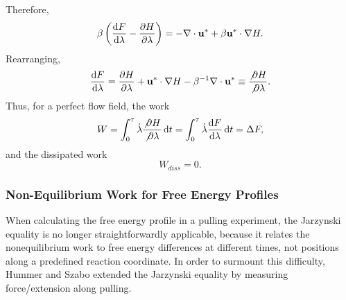 Therefore,
\begin{equation}
	\beta \left( \frac{\mathop{}\!\mathrm{d} F}{\mathop{}\!\mathrm{d} \lambda} - \frac{\partial H}{\partial \lambda} \right) = -\nabla \cdot \mathbf{u}^* + \beta \mathbf{u}^* \cdot \nabla H.
\end{equation}
Rearranging,
\begin{equation}
	\frac{\mathop{}\!\mathrm{d} F}{\mathop{}\!\mathrm{d} \lambda} = \frac{\partial H}{\partial \lambda} + \mathbf{u}^* \cdot \nabla H - \beta^{-1} \nabla \cdot \mathbf{u}^*\equiv \frac{\not{\partial} H}{\not{\partial} \lambda}.
\end{equation}
Thus, for a perfect flow field, the work
\begin{equation}
	W=\int_0^\tau \dot{\lambda} \frac{\not \partial H}{\not \partial \lambda} \mathop{}\!\mathrm{d} t=\int_0^\tau \dot{\lambda} \frac{\mathop{}\!\mathrm{d} F}{\mathop{}\!\mathrm{d} \lambda} \mathop{}\!\mathrm{d} t=\Delta F,
\end{equation}
and the dissipated work
\begin{equation}
	W_{diss}=0.
\end{equation}


\subsubsection{Non-Equilibrium Work for Free Energy Profiles\label{Sec:FEM:NEW:FEP}}
When calculating the free energy profile in a pulling experiment, the Jarzynski equality is no longer straightforwardly applicable, because it relates the nonequilibrium work to free energy differences at different times, not positions along a predefined reaction coordinate. In order to surmount this difficulty, Hummer and Szabo extended the Jarzynski equality by measuring force/extension along pulling.\cite{HummerPNAS2001}

